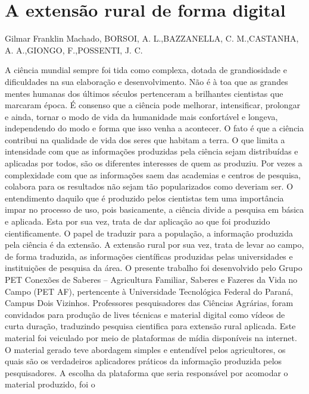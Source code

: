 

\section{A extensão rural de forma digital }

Gilmar Franklin Machado, BORSOI, A. L.,BAZZANELLA, C. M.,CASTANHA, A. A.,GIONGO, F.,POSSENTI, J. C.

A ciência mundial sempre foi tida como complexa, dotada de grandiosidade e dificuldades
na sua elaboração e desenvolvimento. Não é à toa que as grandes mentes humanas dos últimos 
séculos pertenceram a brilhantes cientistas que marcaram época. É consenso que a ciência pode 
melhorar, intensificar, prolongar e ainda, tornar o modo de vida da humanidade mais confortável 
e longeva, independendo do modo e forma que isso venha a acontecer. 
O fato é que a ciência contribui na qualidade de vida dos seres que habitam a terra. O que 
limita a intensidade com que as informações produzidas pela ciência sejam distribuídas e aplicadas 
por todos, são os diferentes interesses de quem as produziu. Por vezes a complexidade com que as 
informações saem das academias e centros de pesquisa, colabora para os resultados não sejam tão 
popularizados como deveriam ser. O entendimento daquilo que é produzido pelos cientistas tem 
uma importância impar no processo de uso, pois basicamente, a ciência divide a pesquisa em básica 
e aplicada. Esta por sua vez, trata de dar aplicação ao que foi produzido cientificamente.
O papel de traduzir para a população, a informação produzida pela ciência é da extensão.
A extensão rural por sua vez, trata de levar ao campo, de forma traduzida, as informações 
científicas produzidas pelas universidades e instituições de pesquisa da área. O presente trabalho 
foi desenvolvido pelo Grupo PET Conexões de Saberes – Agricultura Familiar, Saberes e Fazeres 
da Vida no Campo (PET AF), pertencente à Universidade Tecnológica Federal do Paraná, Campus 
Dois Vizinhos. Professores pesquisadores das Ciências Agrárias, foram convidados para produção 
de lives técnicas e material digital como vídeos de curta duração, traduzindo pesquisa cientifica 
para extensão rural aplicada. Este material foi veiculado por meio de plataformas de mídia 
disponíveis na internet. O material gerado teve abordagem simples e entendível pelos agricultores, 
os quais são os verdadeiros aplicadores práticos da informação produzida pelos pesquisadores. 
A escolha da plataforma que seria responsável por acomodar o material produzido, foi o 
